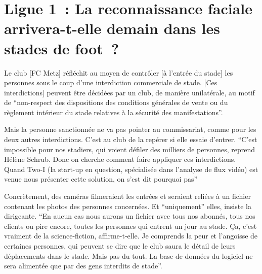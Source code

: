 \section{Ligue 1 : La reconnaissance faciale arrivera-t-elle demain dans les stades de foot ?}

Le club [FC Metz] réfléchit au moyen de contrôler [à l'entrée du stade] les personnes sous le coup d'une interdiction commerciale de stade. [Ces interdictions] peuvent être décidées par un club, de manière unilatérale, au motif de \enquote{non-respect des dispositions des conditions générales de vente ou du règlement intérieur du stade relatives à la sécurité des manifestations}.

Mais la personne sanctionnée ne va pas pointer au commissariat, comme pour les deux autres interdictions. C'est au club de la repérer si elle essaie d'entrer. \enquote{C'est impossible pour nos stadiers, qui voient défiler des milliers de personnes, reprend Hélène Schrub. Donc on cherche comment faire appliquer ces interdictions. Quand Two-I (la start-up en question, spécialisée dans l'analyse de flux vidéo) est venue nous présenter cette solution, on s'est dit pourquoi pas} 

Concrètement, des caméras filmeraient les entrées et seraient reliées à un fichier contenant les photos des personnes concernées. Et \enquote{uniquement} elles, insiste la dirigeante. \enquote{En aucun cas nous aurons un fichier avec tous nos abonnés, tous nos clients ou pire encore, toutes les personnes qui entrent un jour au stade. Ça, c'est vraiment de la science-fiction, affirme-t-elle. Je comprends la peur et l'angoisse de certaines personnes, qui peuvent se dire que le club saura le détail de leurs déplacements dans le stade. Mais pas du tout. La base de données du logiciel ne sera alimentée que par des gens interdits de stade}.
